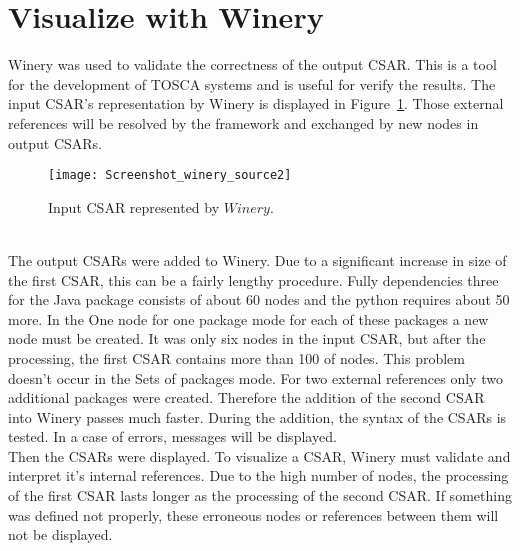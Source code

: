 \section{Visualize with Winery}\label{sec:checkwin}
Winery was used to validate the correctness of the output CSAR. 
 This is a tool for the development of TOSCA systems and is useful for verify the results. %
 The input CSAR's representation by Winery is displayed in Figure~\ref{fig:winery_source2}.
 Those external references will be resolved by the framework and exchanged by new nodes in output CSARs. 
 \begin{figure}[ht]   
 	\centering
 	\texttt{[image: Screenshot\_winery\_source2]}
 	\caption{Input CSAR represented by $Winery$.}
 	\label{fig:winery_source2}
 \end{figure}
   \\
 The output CSARs were added to Winery.
 Due to a significant increase in size of the first CSAR, this can be a fairly lengthy procedure.
Fully dependencies three for the Java package consists of about 60 nodes and the python requires about 50 more. 
In the One node for one package mode for each of these packages a new node must be created.
It was only six nodes in the input CSAR, but after the processing, the first CSAR contains more than 100 of nodes.
This problem doesn't occur in the Sets of packages mode. 
For two external references only two additional packages were created.
Therefore the addition of the second CSAR into Winery passes much faster. 
 During the addition, the syntax of the CSARs is tested.
 In a case of errors, messages will be displayed.
 \\
Then the CSARs were displayed.
To visualize a CSAR, Winery must validate and interpret it's internal references.
Due to the high number of nodes, the processing of the first CSAR lasts longer as the processing of the second CSAR. 
If something was defined not properly, these erroneous nodes or references between them will not be displayed.
